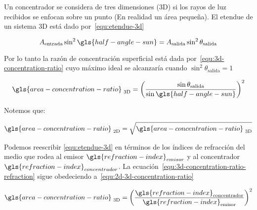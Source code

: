 			Un concentrador se considera de tres dimensiones (3D) si los rayos de luz recibidos se enfocan sobre un punto (En realidad un área pequeña). El \gls{etendue} de un sistema 3D está dado por~\eqref{equ:etendue-3d}
			
			\begin{equation}\label{equ:etendue-3d}
				A_{\text{entrada}}\sin^{2}\gls{half-angle-sun} = A_{\text{salida}}\sin^{2}\theta_{\text{salida}}
			\end{equation}
			
			Por lo tanto la razón de concentración superficial está dada por~\eqref{equ:3d-concentration-ratio} cuyo máximo ideal se alcanzaría cuando \(\sin^{2}\theta_{\text{salida}} = 1\)
			
			\begin{equation}\label{equ:3d-concentration-ratio}
				\gls{area-concentration-ratio}_{\text{\ 3D}} = \left(\dfrac{\sin\theta_{\text{salida}}}{\sin\gls{half-angle-sun}}\right)^{2}
			\end{equation}
			
			Notemos que:
			
			\begin{equation}\label{equ:2d-3d-concentration-ratio}
				\gls{area-concentration-ratio}_{\text{\ 2D}} = \sqrt{\gls{area-concentration-ratio}_{\text{\ 3D}}}
			\end{equation}
			
			Podemos reescribir \eqref{equ:etendue-3d} en términos de los índices de refracción del medio que rodea al emisor \(\gls{refraction-index}_{emisor}\) y al concentrador \(\gls{refraction-index}_{concentrador}\). La ecuación~\cref{equ:3d-concentration-ratio-refraction} sigue obedeciendo a~\eqref{equ:2d-3d-concentration-ratio}
			
			\begin{equation}\label{equ:3d-concentration-ratio-refraction}
				\gls{area-concentration-ratio}_{\text{\ 3D}} = \left(\dfrac{\gls{refraction-index}_{\text{concentrador}}}{\gls{refraction-index}_{\text{emisor}}}\right)^{2}
			\end{equation}
			
	 	
	 	